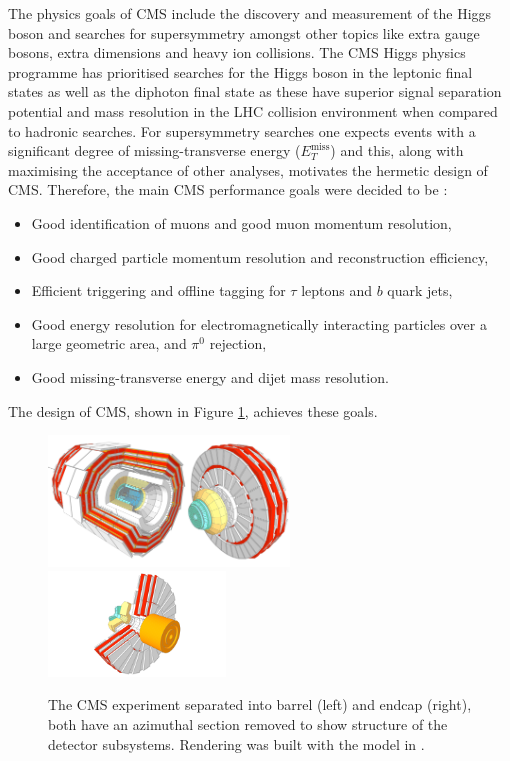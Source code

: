 The physics goals of CMS include the discovery and measurement of the Higgs boson and searches for supersymmetry amongst other topics like extra gauge bosons, extra dimensions and heavy ion collisions. 
The CMS Higgs physics programme has prioritised searches for the Higgs boson in the leptonic final states as well as the diphoton final state as these have superior signal separation potential and mass resolution in the LHC collision environment when compared to hadronic searches. For supersymmetry searches one expects events with a significant degree of missing-transverse energy ($E_{T}^{\mathrm{miss}}$) and this, along with maximising the acceptance of other analyses, motivates the hermetic design of CMS. Therefore, the main CMS performance goals were decided to be \cite{CMSatLHC}:
\begin{itemize}[leftmargin=.5in,noitemsep]
    \item Good identification of muons and good muon momentum resolution,
    \item Good charged particle momentum resolution and reconstruction efficiency,
    \item Efficient triggering and offline tagging for $\tau$ leptons and $b$ quark jets, 
    \item Good energy resolution for electromagnetically interacting particles over a large geometric area, and $\pi^{0}$ rejection,
    \item Good missing-transverse energy and dijet mass resolution.
\end{itemize}
The design of CMS, shown in Figure \ref{fig:apparatus:CMS}, achieves these goals. 
\begin{figure}[h!]
    \begin{center}
        \includegraphics[width=0.57\textwidth]{figures/apparatus/CMS.pdf}
        \includegraphics[width=0.42\textwidth]{figures/apparatus/ENDCAP2.pdf}
    \end{center}    
    \caption{The CMS experiment separated into barrel (left) and endcap (right), both have an azimuthal section removed to show structure of the detector subsystems. Rendering was built with the model in \cite{SketchupCMS}.}
    \label{fig:apparatus:CMS}
\end{figure}



